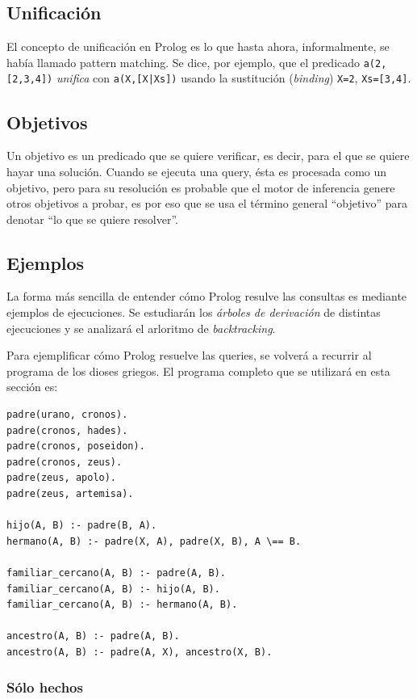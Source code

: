 \documentclass[12pt,titlepage]{article}
\begin{document}
\subsection{Unificación}

El concepto de unificación en Prolog es lo que hasta ahora, informalmente, se había llamado pattern matching. Se dice, por ejemplo, que el predicado \lstinline$a(2, [2,3,4])$ \emph{unifica} con \lstinline$a(X,[X|Xs])$ usando la sustitución (\emph{binding}) \lstinline|X=2|, \lstinline|Xs=[3,4]|.

\subsection{Objetivos}

Un objetivo es un predicado que se quiere verificar, es decir, para el que se quiere hayar una solución. Cuando se ejecuta una query, ésta es procesada como un objetivo, pero para su resolución es probable que el motor de inferencia genere otros objetivos a probar, es por eso que se usa el término general ``objetivo'' para denotar ``lo que se quiere resolver''.

\subsection{Ejemplos}

La forma más sencilla de entender cómo Prolog resulve las consultas es mediante ejemplos de ejecuciones. Se estudiarán los \emph{árboles de derivación} de distintas ejecuciones y se analizará el arloritmo de \emph{backtracking}.

Para ejemplificar cómo Prolog resuelve las queries, se volverá a recurrir al programa de los dioses griegos. El programa completo que se utilizará en esta sección es:
\begin{lstlisting}
padre(urano, cronos).
padre(cronos, hades).
padre(cronos, poseidon).
padre(cronos, zeus).
padre(zeus, apolo).
padre(zeus, artemisa).

hijo(A, B) :- padre(B, A).
hermano(A, B) :- padre(X, A), padre(X, B), A \== B.

familiar_cercano(A, B) :- padre(A, B).
familiar_cercano(A, B) :- hijo(A, B).
familiar_cercano(A, B) :- hermano(A, B).

ancestro(A, B) :- padre(A, B).
ancestro(A, B) :- padre(A, X), ancestro(X, B).
\end{lstlisting}

\subsubsection{Sólo hechos}
\end{document}
